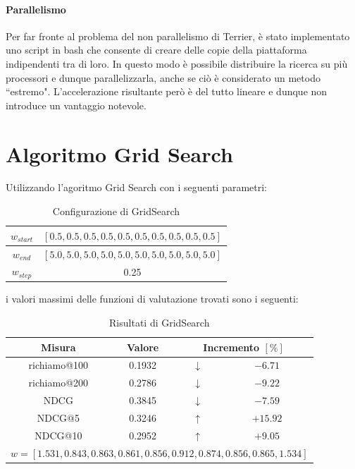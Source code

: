 \paragraph{Parallelismo}
Per far fronte al problema del non parallelismo di Terrier, è stato implementato uno
script in bash che consente di creare delle copie della piattaforma indipendenti tra di loro.
In questo modo è possibile distribuire la ricerca su più processori e dunque parallelizzarla,
anche se ciò è considerato un metodo ``estremo". L'accelerazione risultante però
è del tutto lineare e dunque non introduce un vantaggio notevole.


\section{Algoritmo Grid Search}
Utilizzando l'agoritmo Grid Search con i seguenti parametri:

\begin{table}[h!]
	\centering
	\begin{tabular}{|c|c|}
		\hline
		$w_{start}$ & $[0.5, 0.5, 0.5, 0.5, 0.5, 0.5, 0.5, 0.5, 0.5, 0.5]$ \\
		\hline
		$w_{end}$ & $[5.0, 5.0, 5.0, 5.0, 5.0, 5.0, 5.0, 5.0, 5.0, 5.0]$ \\		
		\hline
		$w_{step}$ & 0.25 \\
		\hline
	\end{tabular}
\caption{Configurazione di GridSearch}
\end{table}

i valori massimi delle funzioni di valutazione trovati sono i seguenti:

\begin{table}[h!]
	\centering
	\begin{tabular}{|c|c|c|c|}
		\hline
		\textbf{Misura} & \textbf{Valore} & \multicolumn{2}{|c|}{\textbf{Incremento} $\left[\%\right]$} \\
		\hline
		richiamo@100  &  0.1932 &   $\downarrow$ & $-6.71$ \\
		\hline
		richiamo@200   & 0.2786 & $\downarrow$ & $-9.22$ \\
		\hline
		NDCG    & 0.3845 &  $\downarrow$ & $-7.59$ \\
		\hline
		NDCG@5  & 0.3246 & $\uparrow$ & $+15.92$ \\
		\hline
		NDCG@10  & 0.2952 & $\uparrow$  & $+9.05$ \\
		\hline
		\multicolumn{4}{|c|}{$w = [1.531, 0.843, 0.863, 0.861, 0.856 , 0.912, 0.874, 0.856, 0.865, 1.534]$} \\
		\hline
	\end{tabular}
	\caption{Risultati di GridSearch}
\end{table}


